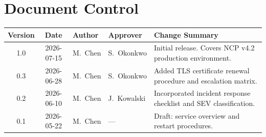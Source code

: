 \section{Document Control}

\begin{tabularx}{\textwidth}{ccllX}
\toprule
\textbf{Version} & \textbf{Date} & \textbf{Author} & \textbf{Approver} & \textbf{Change Summary} \\
\midrule
1.0 & 2026-07-15 & M.\ Chen & S.\ Okonkwo & Initial release. Covers NCP v4.2 production environment. \\
0.3 & 2026-06-28 & M.\ Chen & S.\ Okonkwo & Added TLS certificate renewal procedure and escalation matrix. \\
0.2 & 2026-06-10 & M.\ Chen & J.\ Kowalski & Incorporated incident response checklist and SEV classification. \\
0.1 & 2026-05-22 & M.\ Chen & --- & Draft: service overview and restart procedures. \\
\bottomrule
\end{tabularx}
